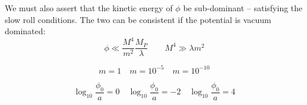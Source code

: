 We must also assert that the kinetic energy of $\phi$ be sub-dominant -- satisfying the slow roll conditions.  The two can be consistent if the potential is vacuum dominated:
\[ \phi \ll \frac{M^4}{m^2} \frac{M_P}{\lambda} \qquad M^4 \gg \lambda m^2 \]

\[m = 1 \quad m = 10^{-5} \quad m = 10^{-10} \]

\[ \log_{10} \frac{\phi_0}{a} = 0 \quad \log_{10} \frac{\phi_0}{a} = -2 \quad \log_{10} \frac{\phi_0}{a} = 4 \]




